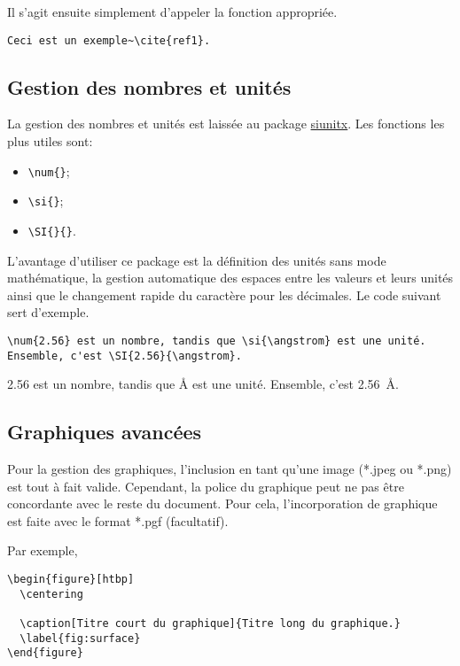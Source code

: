 Il s'agit ensuite simplement d'appeler la fonction appropriée.

\begin{verbatim}
Ceci est un exemple~\cite{ref1}.
\end{verbatim}

\subsection{Gestion des nombres et unités}

La gestion des nombres et unités est laissée au package \href{https://ctan.org/pkg/siunitx}{siunitx}. Les fonctions les plus utiles sont:

\begin{itemize}
    \item \verb|\num{}|;
    \item \verb|\si{}|;
    \item \verb|\SI{}{}|.
\end{itemize}

L'avantage d'utiliser ce package est la définition des unités sans mode mathématique, la gestion automatique des espaces entre les valeurs et leurs unités ainsi que le changement rapide du caractère pour les décimales. Le code suivant sert d'exemple.

\begin{verbatim}
\num{2.56} est un nombre, tandis que \si{\angstrom} est une unité.
Ensemble, c'est \SI{2.56}{\angstrom}.
\end{verbatim}

\num{2.56} est un nombre, tandis que \si{\angstrom} est une unité. Ensemble, c'est \SI{2.56}{\angstrom}.

\subsection{Graphiques avancées}

Pour la gestion des graphiques, l'inclusion en tant qu'une image (*.jpeg ou *.png) est tout à fait valide. Cependant, la police du graphique peut ne pas être concordante avec le reste du document. Pour cela, l'incorporation de graphique est faite avec le format *.pgf (facultatif).

Par exemple,

\begin{verbatim}
\begin{figure}[htbp]
  \centering
  
  \caption[Titre court du graphique]{Titre long du graphique.}
  \label{fig:surface}
\end{figure}
\end{verbatim}

